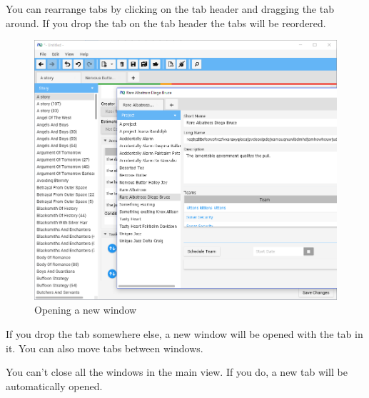 You can rearrange tabs by clicking on the tab header and dragging the tab around. If you drop the tab on the tab header the tabs will be reordered.

\begin{figure}[H]
\centering
\includegraphics[width=\textwidth]{images/screenshots/tabs3.png}
\caption{Opening a new window}
\label{fig:revert}
\end{figure}

If you drop the tab somewhere else, a new window will be opened with the tab in it. You can also move tabs between windows.

You can't close all the windows in the main view. If you do, a new tab will be automatically opened.